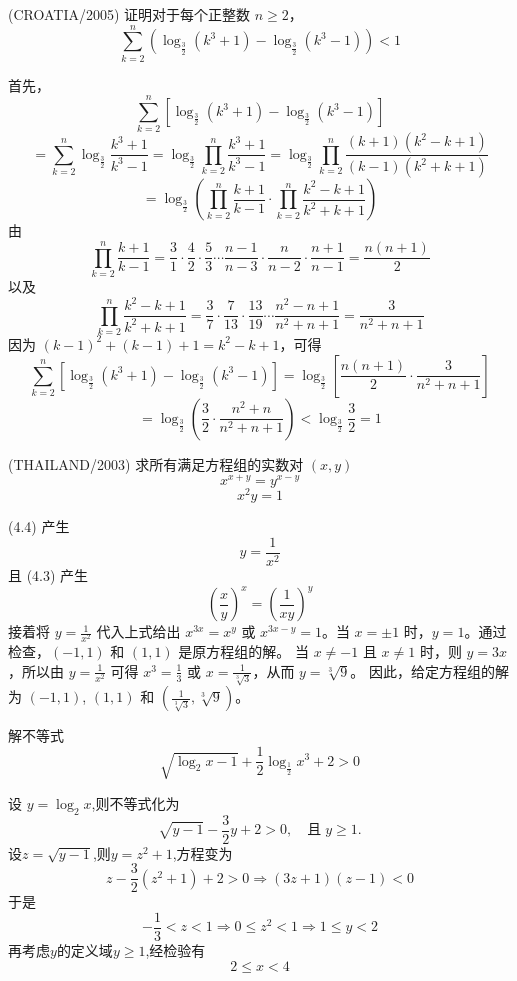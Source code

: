 \begin{questions}
\question (CROATIA/2005) 证明对于每个正整数 $n \ge 2$，
\[
\sum_{k=2}^{n} \left(\log_{\frac{3}{2}}(k^3 + 1) - \log_{\frac{3}{2}}(k^3 - 1)\right) < 1
\]
\begin{solution}
首先，
\[
\sum_{k=2}^{n} \left[\log_{\frac{3}{2}}(k^3 + 1) - \log_{\frac{3}{2}}(k^3 - 1)\right]
\]
\[
= \sum_{k=2}^{n} \log_{\frac{3}{2}} \frac{k^3 + 1}{k^3 - 1} = \log_{\frac{3}{2}} \prod_{k=2}^{n} \frac{k^3 + 1}{k^3 - 1} = \log_{\frac{3}{2}} \prod_{k=2}^{n} \frac{(k + 1)(k^2 - k + 1)}{(k - 1)(k^2 + k + 1)}
\]
\[
= \log_{\frac{3}{2}} \left(\prod_{k=2}^{n} \frac{k + 1}{k - 1} \cdot \prod_{k=2}^{n} \frac{k^2 - k + 1}{k^2 + k + 1}\right)
\]
由
\[
\prod_{k=2}^{n} \frac{k + 1}{k - 1} = \frac{3}{1} \cdot \frac{4}{2} \cdot \frac{5}{3} \cdots \frac{n - 1}{n - 3} \cdot \frac{n}{n - 2} \cdot \frac{n + 1}{n - 1} = \frac{n(n + 1)}{2}
\]
以及
\[
\prod_{k=2}^{n} \frac{k^2 - k + 1}{k^2 + k + 1} = \frac{3}{7} \cdot \frac{7}{13} \cdot \frac{13}{19} \cdots \frac{n^2 - n + 1}{n^2 + n + 1} = \frac{3}{n^2 + n + 1}
\]
因为 $(k - 1)^2 + (k - 1) + 1 = k^2 - k + 1$，可得
\[
\sum_{k=2}^{n} \left[\log_{\frac{3}{2}}(k^3 + 1) - \log_{\frac{3}{2}}(k^3 - 1)\right] = \log_{\frac{3}{2}} \left[\frac{n(n + 1)}{2} \cdot \frac{3}{n^2 + n + 1}\right]
\]
\[
= \log_{\frac{3}{2}} \left(\frac{3}{2} \cdot \frac{n^2 + n}{n^2 + n + 1}\right) < \log_{\frac{3}{2}} \frac{3}{2} = 1
\]
\end{solution}

\question (THAILAND/2003) 求所有满足方程组的实数对 $(x, y)$
\[
x^{x+y} = y^{x-y}
\]
\[
x^2y = 1
\]
\begin{solution}
(4.4) 产生
\[
y = \frac{1}{x^2}
\]
且 (4.3) 产生
\[
\left(\frac{x}{y}\right)^x = \left(\frac{1}{xy}\right)^y
\]
接着将 $y = \frac{1}{x^2}$ 代入上式给出 $x^{3x} = x^y$ 或 $x^{3x-y} = 1$。当 $x = \pm 1$ 时，$y = 1$。通过检查，$(-1, 1)$ 和 $(1, 1)$ 是原方程组的解。
当 $x \ne -1$ 且 $x \ne 1$ 时，则 $y = 3x$，所以由 $y = \frac{1}{x^2}$ 可得 $x^3 = \frac{1}{3}$ 或 $x = \frac{1}{\sqrt[3]{3}}$，从而 $y = \sqrt[3]{9}$。
因此，给定方程组的解为 $(-1, 1)$, $(1, 1)$ 和 $\left(\frac{1}{\sqrt[3]{3}}, \sqrt[3]{9}\right)$。
\end{solution}

    \question 解不等式
    \[
    \sqrt{\log_2 x - 1} + \frac{1}{2} \log_{\frac{1}{2}} x^3 + 2 > 0
    \]
    \begin{solution}
        设 \( y = \log_2 x \),则不等式化为
        \[
        \sqrt{y - 1} - \frac{3}{2} y + 2 > 0, \quad \text{且} \;y \ge 1.
        \]
        设$z=\sqrt{y - 1}$,则$y=z^2+1$,方程变为
        \[
        z - \frac{3}{2} (z^2+1) + 2 > 0 \Rightarrow (3z+1)(z-1)<0 
        \]
        于是
        \[
        -\frac13<z<1 \Rightarrow 0\leq z^2<1 \Rightarrow1\leq y<2 
        \]
        再考虑$y$的定义域$y\geq1$,经检验有
        \[
        2\leq x <4
        \]
    \end{solution}
    

\end{questions}
